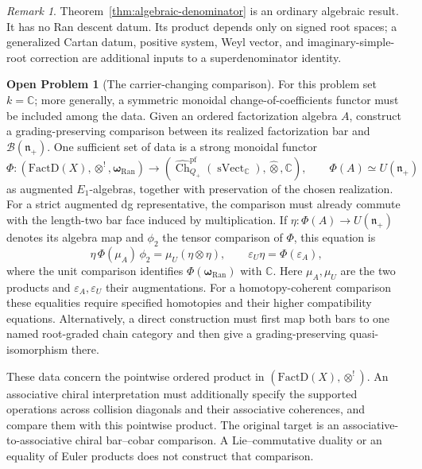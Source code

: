 \documentclass[11pt,reqno]{amsart}
\theoremstyle{definition}
\newtheorem{problem}[theorem]{Open Problem}
\theoremstyle{remark}
\newtheorem{remark}[theorem]{Remark}
\providecommand{\Ran}{\mathrm{Ran}}
\providecommand{\FactD}{\mathrm{FactD}}
\begin{document}
\begin{remark}
Theorem~\ref{thm:algebraic-denominator} is an ordinary algebraic result.
It has no Ran descent datum.  Its product depends only on signed root
spaces; a generalized Cartan datum, positive system, Weyl vector, and
imaginary-simple-root correction are additional inputs to a
superdenominator identity.
\end{remark}

\begin{problem}[The carrier-changing comparison]
\label{prob:carrier-change}
For this problem set \(k=\mathbb C\); more generally, a symmetric
monoidal change-of-coefficients functor must be included among the data.
Given an ordered factorization algebra \(A\), construct a
grading-preserving comparison between its realized factorization bar and
\(\mathcal B(\mathfrak n_+)\).  One sufficient set of data is a strong
monoidal functor
\[
 \Phi:
 (\FactD(X),\otimes^!,\boldsymbol\omega_{\Ran})
 \longrightarrow
 \left(
 \widehat{\operatorname{Ch}}^{\mathrm{pf}}_{Q_+}
   (\operatorname{sVect}_{\mathbb C}),
 \widehat\otimes,\mathbb C\right),
 \qquad
 \Phi(A)\simeq U(\mathfrak n_+)
\]
as augmented \(E_1\)-algebras, together with preservation of the chosen
realization.  For a strict augmented dg representative, the comparison
must already commute with the length-two bar face induced by
multiplication.  If \(\eta:\Phi(A)\to U(\mathfrak n_+)\) denotes its
algebra map and \(\phi_2\) the tensor comparison of \(\Phi\), this equation is
\[
 \eta\,\Phi(\mu_A)\,\phi_2
 =\mu_U(\eta\otimes\eta),
 \qquad
 \varepsilon_U\eta=\Phi(\varepsilon_A),
\]
where the unit comparison identifies \(\Phi(\boldsymbol\omega_{\Ran})\)
with \(\mathbb C\).  Here \(\mu_A,\mu_U\) are the two products and
\(\varepsilon_A,\varepsilon_U\) their augmentations.
For a homotopy-coherent comparison these equalities require specified
homotopies and their higher compatibility equations.
Alternatively, a direct construction must first map
both bars to one named root-graded chain category and then give a
grading-preserving quasi-isomorphism there.

These data concern the pointwise ordered product in
\((\FactD(X),\otimes^!)\).  An associative chiral interpretation
must additionally specify the supported operations across collision
diagonals and their associative coherences, and compare them with this
pointwise product.  The original target is an associative-to-associative
chiral bar--cobar comparison.  A Lie--commutative duality or an equality
of Euler products does not construct that comparison.
\end{problem}
\end{document}
